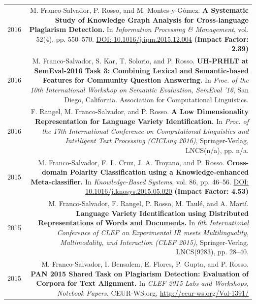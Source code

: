 \documentclass[10pt]{article}
\begin{document}
\section*{}
\begin{tabular}{L!{\VRule}R}
	2016&M. Franco-Salvador, P. Rosso, and M. Montes-y-G{\'o}mez. \textbf{A Systematic Study of Knowledge Graph Analysis for Cross-language Plagiarism Detection.}
	In \emph{Information Processing \& Management}, vol. 52(4), pp. 550--570. \href{http://dx.doi.org/10.1016/j.ipm.2015.12.004}{DOI: 10.1016/j.ipm.2015.12.004} \textbf{(Impact Factor: 2.39)} \vspace{5pt}\\
	2016 &M. Franco-Salvador, S. Kar, T. Solorio, and P. Rosso. \textbf{UH-PRHLT at SemEval-2016 Task 3: Combining Lexical and Semantic-based Features for Community Question Answering.} In \emph{Proc. of the 10th International Workshop on Semantic Evaluation, SemEval '16}, San Diego, California. Association for Computational Linguistics. \vspace{5pt}\\
	2016 &F. Rangel, M. Franco-Salvador, and P. Rosso. \textbf{A Low Dimensionality Representation for Language Variety Identification.} In \emph{Proc. of the 17th International Conference on Computational Linguistics and Intelligent Text Processing (CICLing 2016)}, Springer-Verlag, LNCS(n/a), pp. n/a. \vspace{5pt}\\
	2015&M. Franco-Salvador, F. L. Cruz, J. A. Troyano, and P. Rosso. \textbf{Cross-domain Polarity Classification using a Knowledge-enhanced Meta-classifier.}
	In \emph{Knowledge-Based Systems}, vol. 86, pp. 46--56. \href{http://dx.doi.org/10.1016/j.knosys.2015.05.020}{DOI: 10.1016/j.knosys.2015.05.020} \textbf{(Impact Factor: 4.53)} \vspace{5pt}\\
	2015&M. Franco-Salvador, F. Rangel, P. Rosso, M. Taul{\'e}, and A. Mart{\'i}. \textbf{Language Variety Identification using Distributed Representations of Words and Documents.}
	In \emph{6th International Conference of CLEF on Experimental IR meets Multilinguality, Multimodality, and Interaction (CLEF 2015)}, Springer-Verlag, LNCS(9283), pp. 
28--40. \vspace{5pt}\\
	2015&M. Franco-Salvador, I. Bensalem, E. Flores, P. Gupta, and P. Rosso. \textbf{PAN 2015 Shared Task on Plagiarism Detection: Evaluation of Corpora for Text Alignment.}
	In \emph{CLEF 2015 Labs and Workshops, Notebook Papers.} CEUR-WS.org, \href{http://ceur-ws.org/Vol-1391/}{http://ceur-ws.org/Vol-1391/} \vspace{5pt}\\

\end{tabular}
\end{document}
